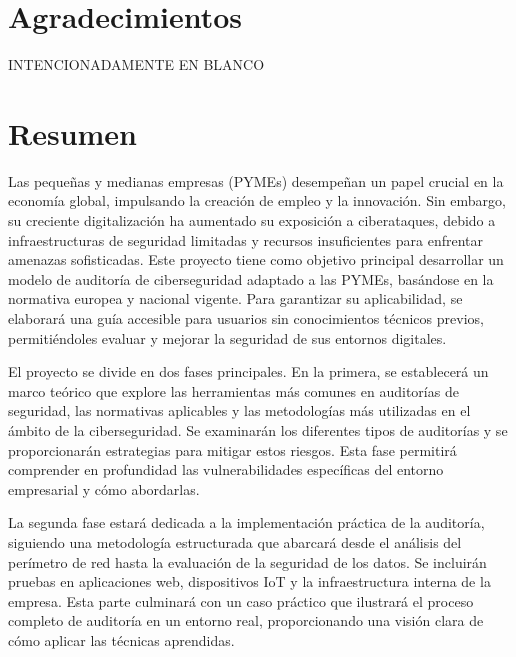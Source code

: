 \documentclass[a4paper, 10pt]{article}
\begin{document}
\section*{Agradecimientos}
\thispagestyle{empty}
INTENCIONADAMENTE EN BLANCO

\clearpage


\section*{Resumen}
\thispagestyle{empty}
Las pequeñas y medianas empresas (PYMEs) desempeñan un papel crucial en la economía global, impulsando la creación de empleo y la innovación. Sin embargo, su creciente
digitalización ha aumentado su exposición a ciberataques, debido a infraestructuras de seguridad limitadas y recursos insuficientes para enfrentar amenazas sofisticadas. 
Este proyecto tiene como objetivo principal desarrollar un modelo de auditoría de ciberseguridad adaptado a las PYMEs, basándose en la normativa europea y nacional vigente. Para garantizar su aplicabilidad, se elaborará una guía accesible para usuarios sin conocimientos técnicos previos, permitiéndoles evaluar y mejorar la seguridad de sus entornos digitales.
\par\vspace{0.5cm}

El proyecto se divide en dos fases principales. En la primera, se establecerá un marco teórico que explore las herramientas más comunes en auditorías de seguridad, las normativas aplicables y las metodologías más utilizadas en el ámbito de la ciberseguridad. Se examinarán los diferentes tipos de auditorías y se proporcionarán estrategias para mitigar estos riesgos. Esta fase permitirá comprender en profundidad las vulnerabilidades específicas del entorno empresarial y cómo abordarlas.
\par\vspace{0.5cm}

La segunda fase estará dedicada a la implementación práctica de la auditoría, siguiendo una metodología estructurada que abarcará desde el análisis del perímetro de red hasta la evaluación de la seguridad de los datos. Se incluirán pruebas en aplicaciones web, dispositivos IoT y la infraestructura interna de la empresa. Esta parte culminará con un caso práctico que ilustrará el proceso completo de auditoría en un entorno real, proporcionando una visión clara de cómo aplicar las técnicas aprendidas.
\par\vspace{0.5cm}
\end{document}

